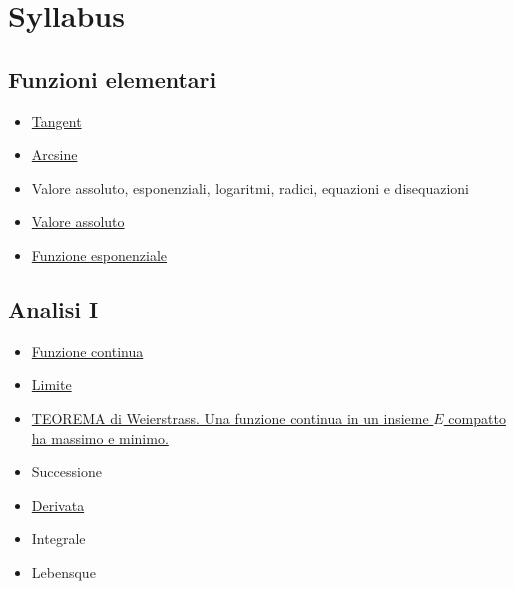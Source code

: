 \chapter{Syllabus}
\section*{Funzioni elementari}
\begin{itemize}
 \item \href{Tangent.pdf}{Tangent}
 \item \href{Arcsine.pdf}{Arcsine}
 \item Valore assoluto, esponenziali, logaritmi, radici, equazioni e disequazioni
 \item \href{./ValoreAssoluto.pdf}{Valore assoluto}
 \item \href{./FunzioneEsponenziale.pdf}{Funzione esponenziale} 
\end{itemize}

\section{Analisi I}
\begin{itemize}
 \item \href{FunzioneContinua.pdf}{Funzione continua}
 \item \href{Limite.pdf}{Limite}
 \item \href{Weierstrass.pdf}{TEOREMA di Weierstrass. Una funzione continua in un insieme $E$ compatto ha massimo e minimo.}
 \item Successione
 \item \href{Derivata.pdf}{Derivata} 
 \item Integrale
 \item Lebensque
\end{itemize}

